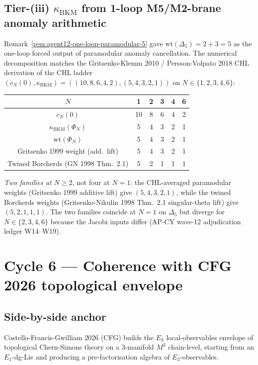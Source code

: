 \subsection*{Tier-(iii) $\kappa_{\mathrm{BKM}}$ from 1-loop
M5/M2-brane anomaly arithmetic}

Remark~\ref{rem:agent12-one-loop-paramodular-5} gave
$\mathrm{wt}(\Delta_5) = 2 + 3 = 5$ as the one-loop forced output of
paramodular anomaly cancellation. The numerical decomposition matches
the Gritsenko-Klemm 2010 / Persson-Volpato 2018 CHL derivation of the
CHL ladder $(c_N(0), \kappa_{\mathrm{BKM}}) = ((10, 8, 6, 4, 2), (5, 4,
3, 2, 1))$ on $N \in \{1, 2, 3, 4, 6\}$:

\begin{center}
\renewcommand{\arraystretch}{1.2}
\begin{tabular}{cccccc}
\toprule
$N$ & 1 & 2 & 3 & 4 & 6 \\
\midrule
$c_N(0)$ & 10 & 8 & 6 & 4 & 2 \\
$\kappa_{\mathrm{BKM}}(\Phi_N)$ & 5 & 4 & 3 & 2 & 1 \\
$\mathrm{wt}(\Phi_N)$ & 5 & 4 & 3 & 2 & 1 \\
Gritsenko 1999 weight (add.\ lift) & 5 & 4 & 3 & 2 & 1 \\
Twined Borcherds (GN 1998 Thm.~2.1) & 5 & 2 & 1 & 1 & 1 \\
\bottomrule
\end{tabular}
\end{center}

\emph{Two families at $N \geq 2$}, not four at $N = 1$: the
CHL-averaged paramodular weights (Gritsenko 1999 additive lift) give
$(5, 4, 3, 2, 1)$, while the twined Borcherds weights (Gritsenko-Nikulin
1998 Thm.~2.1 singular-theta lift) give $(5, 2, 1, 1, 1)$. The two
families coincide at $N = 1$ on $\Delta_5$ but diverge for
$N \in \{2, 3, 4, 6\}$ because the Jacobi inputs differ (AP-CY
wave-12 adjudication ledger W14--W19).

\section{Cycle 6 --- Coherence with CFG 2026 topological envelope}
\label{sec:agent12-cfg-coherence}

\subsection*{Side-by-side anchor}

Costello-Francis-Gwilliam 2026 (CFG) builds the $E_3$ local-observables
envelope of topological Chern-Simons theory on a $3$-manifold $M^3$
chain-level, starting from an $E_1$-dg-Lie and producing a
pre-factorisation algebra of $E_3$-observables.


